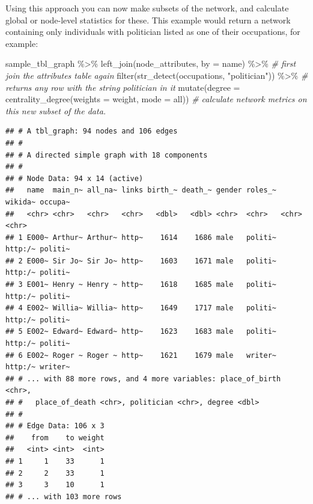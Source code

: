 \documentclass[
]{book}
\newenvironment{Shaded}{\begin{snugshade}}{\end{snugshade}}
\newcommand{\AttributeTok}[1]{\textcolor[rgb]{0.77,0.63,0.00}{#1}}
\newcommand{\CommentTok}[1]{\textcolor[rgb]{0.56,0.35,0.01}{\textit{#1}}}
\newcommand{\FunctionTok}[1]{\textcolor[rgb]{0.00,0.00,0.00}{#1}}
\newcommand{\NormalTok}[1]{#1}
\newcommand{\SpecialCharTok}[1]{\textcolor[rgb]{0.00,0.00,0.00}{#1}}
\newcommand{\StringTok}[1]{\textcolor[rgb]{0.31,0.60,0.02}{#1}}
\begin{document}
Using this approach you can now make subsets of the network, and calculate global or node-level statistics for these. This example would return a network containing only individuals with politician listed as one of their occupations, for example:

\begin{Shaded}
\begin{Highlighting}[]
\NormalTok{sample\_tbl\_graph }\SpecialCharTok{\%\textgreater{}\%} 
  \FunctionTok{left\_join}\NormalTok{(node\_attributes, }\AttributeTok{by =} \StringTok{\textquotesingle{}name\textquotesingle{}}\NormalTok{) }\SpecialCharTok{\%\textgreater{}\%} \CommentTok{\# first join the attributes table again}
  \FunctionTok{filter}\NormalTok{(}\FunctionTok{str\_detect}\NormalTok{(occupations, }\StringTok{"politician"}\NormalTok{)) }\SpecialCharTok{\%\textgreater{}\%} \CommentTok{\# returns any row with the string \textquotesingle{}politician\textquotesingle{} in it}
  \FunctionTok{mutate}\NormalTok{(}\AttributeTok{degree =} \FunctionTok{centrality\_degree}\NormalTok{(}\AttributeTok{weights =}\NormalTok{ weight, }\AttributeTok{mode =} \StringTok{\textquotesingle{}all\textquotesingle{}}\NormalTok{)) }\CommentTok{\# calculate network metrics on this new subset of the data.}
\end{Highlighting}
\end{Shaded}

\begin{verbatim}
## # A tbl_graph: 94 nodes and 106 edges
## #
## # A directed simple graph with 18 components
## #
## # Node Data: 94 x 14 (active)
##   name  main_n~ all_na~ links birth_~ death_~ gender roles_~ wikida~ occupa~
##   <chr> <chr>   <chr>   <chr>   <dbl>   <dbl> <chr>  <chr>   <chr>   <chr>  
## 1 E000~ Arthur~ Arthur~ http~    1614    1686 male   politi~ http:/~ politi~
## 2 E000~ Sir Jo~ Sir Jo~ http~    1603    1671 male   politi~ http:/~ politi~
## 3 E001~ Henry ~ Henry ~ http~    1618    1685 male   politi~ http:/~ politi~
## 4 E002~ Willia~ Willia~ http~    1649    1717 male   politi~ http:/~ politi~
## 5 E002~ Edward~ Edward~ http~    1623    1683 male   politi~ http:/~ politi~
## 6 E002~ Roger ~ Roger ~ http~    1621    1679 male   writer~ http:/~ writer~
## # ... with 88 more rows, and 4 more variables: place_of_birth <chr>,
## #   place_of_death <chr>, politician <chr>, degree <dbl>
## #
## # Edge Data: 106 x 3
##    from    to weight
##   <int> <int>  <int>
## 1     1    33      1
## 2     2    33      1
## 3     3    10      1
## # ... with 103 more rows
\end{verbatim}
\end{document}
